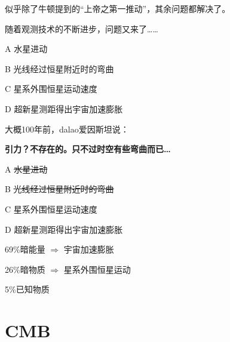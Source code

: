 \documentclass[CJK]{beamer}
\begin{document}
\begin{frame}

  \bch
  似乎除了牛顿提到的“上帝之第一推动”，其余问题都解决了。
  \ech
\end{frame}


\begin{frame}
  \bch
  随着观测技术的不断进步，问题又来了……
  \ech
\end{frame}


\begin{frame}
  \bch
  \emini
  \bitem
\item[A]{水星进动}
\item[B]{光线经过恒星附近时的弯曲}
\item[C]{星系外围恒星运动速度}
\item[D]{超新星测距得出宇宙加速膨胀}
  \eitem
  \emini
  \ech
\end{frame}

\begin{frame}
  \bch

  
  \emini
  大概100年前，dalao爱因斯坦说：

  \skipline
  
  {\Large \bf 引力？不存在的。只不过时空有些弯曲而已…}

  \skiplines
  
  \bitem
\item[A]{\sout{水星进动}}
\item[B]{\sout{光线经过恒星附近时的弯曲}}
\item[C]{星系外围恒星运动速度}
\item[D]{超新星测距得出宇宙加速膨胀}  
  \eitem
  \emini
  \ech
\end{frame}

\begin{frame}
  \bch
  \emini
  \bitem
\item{69\%暗能量 $\Rightarrow$ 宇宙加速膨胀}
\item{26\%暗物质 $\Rightarrow$ 星系外围恒星运动}
\item{5\%已知物质}
  \eitem
  \emini
  \ech
\end{frame}

\section{CMB}
\end{document}
